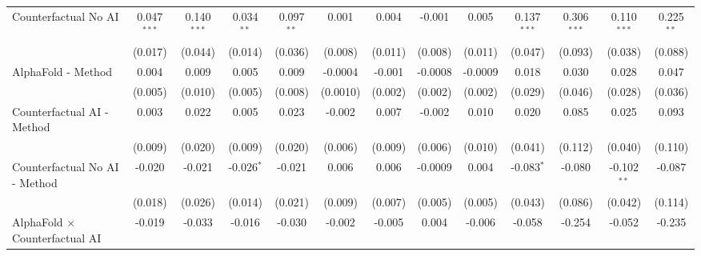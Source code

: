 \begin{tabular}{lcccccccccccc}
   Counterfactual No AI                                       & 0.047$^{***}$  & 0.140$^{***}$ & 0.034$^{**}$   & 0.097$^{**}$ & 0.001          & 0.004        & -0.001        & 0.005        & 0.137$^{***}$ & 0.306$^{***}$ & 0.110$^{***}$ & 0.225$^{**}$\\   
                                                              & (0.017)        & (0.044)       & (0.014)        & (0.036)      & (0.008)        & (0.011)      & (0.008)       & (0.011)      & (0.047)       & (0.093)       & (0.038)       & (0.088)\\   
   AlphaFold - Method                                         & 0.004          & 0.009         & 0.005          & 0.009        & -0.0004        & -0.001       & -0.0008       & -0.0009      & 0.018         & 0.030         & 0.028         & 0.047\\   
                                                              & (0.005)        & (0.010)       & (0.005)        & (0.008)      & (0.0010)       & (0.002)      & (0.002)       & (0.002)      & (0.029)       & (0.046)       & (0.028)       & (0.036)\\   
   Counterfactual AI - Method                                 & 0.003          & 0.022         & 0.005          & 0.023        & -0.002         & 0.007        & -0.002        & 0.010        & 0.020         & 0.085         & 0.025         & 0.093\\   
                                                              & (0.009)        & (0.020)       & (0.009)        & (0.020)      & (0.006)        & (0.009)      & (0.006)       & (0.010)      & (0.041)       & (0.112)       & (0.040)       & (0.110)\\   
   Counterfactual No AI - Method                              & -0.020         & -0.021        & -0.026$^{*}$   & -0.021       & 0.006          & 0.006        & -0.0009       & 0.004        & -0.083$^{*}$  & -0.080        & -0.102$^{**}$ & -0.087\\   
                                                              & (0.018)        & (0.026)       & (0.014)        & (0.021)      & (0.009)        & (0.007)      & (0.005)       & (0.005)      & (0.043)       & (0.086)       & (0.042)       & (0.114)\\   
   AlphaFold $\times$ Counterfactual AI                       & -0.019         & -0.033        & -0.016         & -0.030       & -0.002         & -0.005       & 0.004         & -0.006       & -0.058        & -0.254        & -0.052        & -0.235\\   

\end{tabular}
